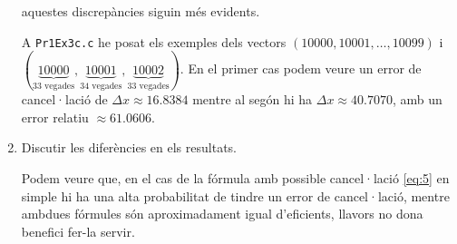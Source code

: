 \documentclass[a4paper, 12pt]{article}
\begin{document}
\begin{exercici}
\begin{enumerate}[label=\alph*)]
            aquestes discrepàncies siguin més evidents.\\
            \begin{solucio}
                A \verb|Pr1Ex3c.c| he posat els exemples dels vectors $\left(10000, 10001, \dots, 10099\right)$ i $(\underbrace{10000}_\text{33 vegades}, \underbrace{10001}_\text{34 vegades},\underbrace{10002}_\text{33 vegades})$.
                En el primer cas podem veure un error de cancel·lació de $\Delta x \approx 16.8384$
                mentre al segón hi ha $\Delta x \approx 40.7070$, amb un error relatiu $\approx 61.0606$.
            \end{solucio}
            \item Discutir les diferències en els resultats.\\
            \begin{solucio}
                Podem veure que, en el cas de la fórmula amb possible cancel·lació \eqref{eq:5} en
                simple hi ha una alta probabilitat de tindre un error de cancel·lació, mentre 
                ambdues fórmules són aproximadament igual d'eficients, llavors no dona benefici
                fer-la servir.
            \end{solucio}
        \end{enumerate}
    \end{exercici}
    \newpage
\end{document}
